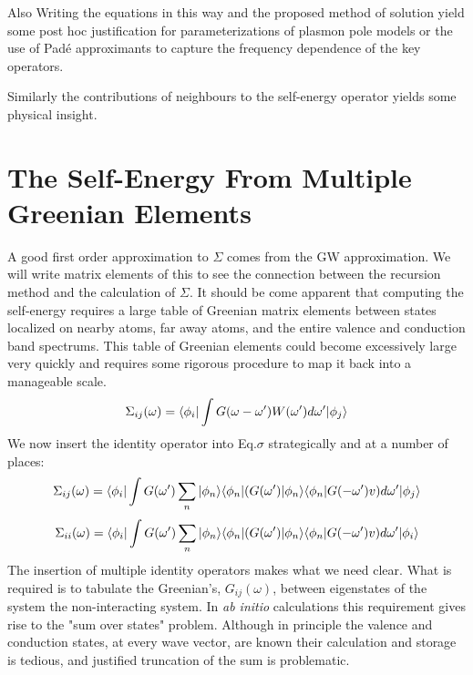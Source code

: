 Also Writing the equations in this way and the proposed method of solution
yield some post hoc justification for parameterizations of plasmon
pole models or the use of Pad\'e approximants to capture the frequency dependence
of the key operators.

Similarly the contributions of neighbours to the self-energy 
operator yields some physical insight.

\section{The Self-Energy From Multiple Greenian Elements}
  A good first order approximation to $\Sigma$ comes from the GW approximation.
We will write matrix elements of this to see the connection between the
recursion method and the calculation of $\Sigma$. It should be come apparent that computing
the self-energy requires a large table of Greenian matrix elements between states localized
on nearby atoms, far away atoms, and the entire valence and conduction band spectrums. 
This table of Greenian elements could become excessively large very quickly and requires some
rigorous procedure to map it back into a manageable scale.
%
\begin{equation}
\label{eq:sigma}
\Sigma_{ij}(\omega) = \langle\phi_{i}|\int G(\omega-\omega')W(\omega')d\omega'|\phi_{j}\rangle
\end{equation}
%
	We now insert the identity operator into Eq.$\sigma$ strategically and at 
a number of places:
%
\begin{equation}
\label{eq:sigma}
\Sigma_{ij}(\omega) = \langle\phi_{i}|\int G(\omega')\sum_{n}|\phi_{n}\rangle\langle\phi_{n}|(G(\omega')|\phi_{n}\rangle\langle\phi_{n}|G(-\omega')v)d\omega'|\phi_{j}\rangle
\end{equation}
%
\begin{equation}
\label{eq:sigma_onsite}%
\Sigma_{ii}(\omega) = \bra\phi_{i}|\int G(\omega')\sum_{n}|\phi_{n}\ket\bra\phi_{n}|(G(\omega')|\phi_{n}\ket\bra\phi_{n}|G(-\omega')v)d\omega'|\phi_{i}\ket
\end{equation}
%
The insertion of multiple identity operators makes what we need clear. What is required 
is to tabulate the Greenian's, $G_{ij}(\omega)$, between eigenstates of the system
the non-interacting system. In {\it ab initio} calculations this requirement 
gives rise to the "sum over states" problem. Although in principle the valence
and conduction states, at every wave vector, are known their calculation and storage
is tedious, and justified truncation of the sum is problematic.

